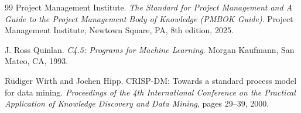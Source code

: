 \begin{thebibliography}{99}
 Project Management Institute. \emph{The Standard for Project Management and A Guide to the Project Management Body of Knowledge (PMBOK Guide)}. Project Management Institute, Newtown Square, PA, 8th edition, 2025.

 J. Ross Quinlan. \emph{C4.5: Programs for Machine Learning}. Morgan Kaufmann, San Mateo, CA, 1993.

 Rüdiger Wirth and Jochen Hipp. CRISP-DM: Towards a standard process model for data mining. \emph{Proceedings of the 4th International Conference on the Practical Application of Knowledge Discovery and Data Mining}, pages 29--39, 2000.

\end{thebibliography}
